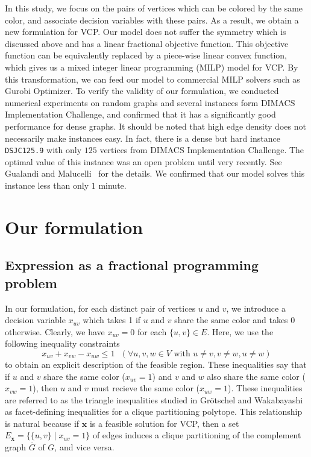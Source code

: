 \documentclass[11pt,a4paper]{article}
\newcommand{\bfx}{\boldsymbol{x}}
\begin{document}
\par 

In this study, we focus on the pairs of vertices which can be colored by the same color, 
and associate decision variables with these pairs. 
As a result, we obtain a new formulation for VCP. 
Our model does not suffer the symmetry which is discussed above and has a linear fractional objective function. 
This objective function can be equivalently replaced by a piece-wise linear convex function, 
which gives us a mixed integer linear programming (MILP) model for VCP. 
By this transformation, we can feed our model to commercial MILP solvers such as Gurobi Optimizer. 
To verify the validity of our formulation, we conducted numerical experiments 
on random graphs and several instances form DIMACS Implementation Challenge, 
and confirmed that it has a significantly good performance for dense graphs. 
It should be noted that high edge density does not necessarily make instances easy. 
In fact, there is a dense but hard instance \texttt{DSJC125.9} with only $125$ vertices from DIMACS Implementation Challenge. 
The optimal value of this instance was an open problem until very recently. See Gualandi and Malucelli~\cite{GuMa} for the details.  
We confirmed that our model solves this instance less than only $1$ minute. 


\section{Our formulation}\label{sec:F}

\subsection{Expression as a fractional programming problem}

In our formulation, for each distinct pair of vertices $u$ and $v$, 
we introduce a decision variable $x_{uv}$ 
which takes 1 if $u$ and $v$ share the same color and takes 0 otherwise. 
Clearly, we have $x_{uv} = 0$ for each $\{u,v\} \in E$. 
Here, we use the following inequality constraints 
\begin{equation*}
x_{uv} + x_{vw} - x_{uw} \le 1~~~(\forall u, v, w \in V \mbox{ with } u \not= v, v \not= w, u \not= w) 
\end{equation*}
to obtain an explicit description of the feasible region. 
These inequalities say that if $u$ and $v$ share the same color ($x_{uv}=1$) 
and $v$ and $w$ also share the same color ($x_{vw}=1$), 
then $u$ and $v$ must recieve the same color ($x_{uw}=1$). 
These inequalities are referred to as the triangle inequalities 
studied in Gr\"otschel and Wakabayashi~\cite{GrWa} as facet-defining inequalities for a clique partitioning polytope. 
This relationship is natural because 
if $\bfx$ is a feasible solution for VCP, then a set $E_{\bfx} = \{ \{u,v\} \mid x_{uv}=1 \}$ of edges 
induces a clique partitioning of the complement graph $\overline{G}$ of $G$, and vice versa. 
\end{document}
